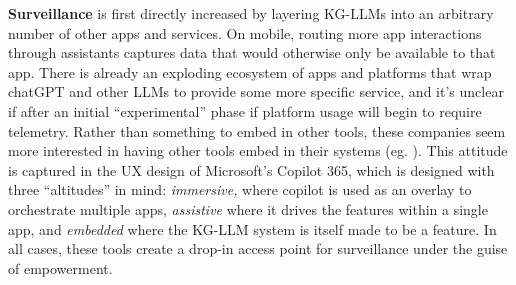 \textbf{Surveillance} is first directly increased by layering KG-LLMs
into an arbitrary number of other apps and services. On mobile, routing
more app interactions through assistants captures data that would
otherwise only be available to that app. There is already an exploding
ecosystem of apps and platforms that wrap chatGPT and other LLMs to
provide some more specific service, and it's unclear if after an initial
``experimental'' phase if platform usage will begin to require
telemetry. Rather than something to embed in other tools, these
companies seem more interested in having other tools embed in their
systems (eg. \cite{microsoftgraphdeveloperdocumentationMicrosoftGraphConnectors2022} ).
This attitude is captured in the UX design of Microsoft's Copilot 365,
which is designed with three ``altitudes'' in mind: \emph{immersive,}
where copilot is used as an overlay to orchestrate multiple apps,
\emph{assistive} where it drives the features within a single app, and
\emph{embedded} where the KG-LLM system is itself made to be a feature.
In all cases, these tools create a drop-in access point for surveillance
under the guise of empowerment.

